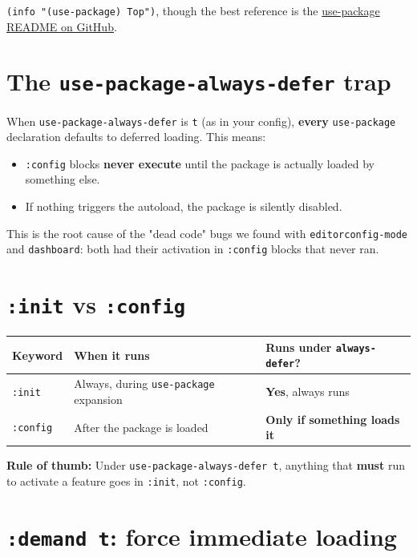 \texttt{(info "(use-package) Top")}, though the best reference is the \href{https://github.com/jwiegley/use-package}{use-package README on GitHub}.

\section{The \texttt{use-package-always-defer} trap}\label{the-use-package-always-defer-trap}

When \texttt{use-package-always-defer} is \texttt{t} (as in your config), \textbf{every} \texttt{use-package} declaration defaults to deferred loading. This means:

\begin{itemize}
\item \texttt{:config} blocks \textbf{never execute} until the package is actually loaded by something else.
\item If nothing triggers the autoload, the package is silently disabled.
\end{itemize}

This is the root cause of the "dead code" bugs we found with \texttt{editorconfig-mode} and \texttt{dashboard}: both had their activation in \texttt{:config} blocks that never ran.

\section{\texttt{:init} vs \texttt{:config}}\label{init-vs-config}

\begin{longtable}[]{@{}lll@{}}
\toprule
Keyword & When it runs & Runs under \texttt{always-defer}? \\
\midrule
\texttt{:init} & Always, during \texttt{use-package} expansion & \textbf{Yes}, always runs \\
\texttt{:config} & After the package is loaded & \textbf{Only if something loads it} \\
\bottomrule
\end{longtable}

\textbf{Rule of thumb:} Under \texttt{use-package-always-defer t}, anything that \textbf{must} run to activate a feature goes in \texttt{:init}, not \texttt{:config}.

\section{\texttt{:demand t}: force immediate loading}\label{demand-t-force-immediate-loading}

